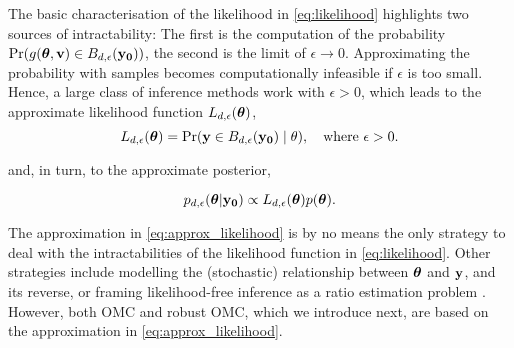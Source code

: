 The basic characterisation of the likelihood in \eqref{eq:likelihood}
highlights two sources of intractability: The first is the computation
of the probability
\(\Pr(g(\boldsymbol{\theta},\mathbf{v}) \in B_{d,\epsilon}(\mathbf{y_0}))\), the second is the
limit of \(\epsilon \to 0\).  Approximating the probability with
samples becomes computationally infeasible if \(\epsilon\) is too
small. Hence, a large class of inference methods work with
\(\epsilon > 0\), which leads to the approximate likelihood function
\(L_{d, \epsilon}(\boldsymbol{\theta})\),
\begin{equation} \label{eq:approx_likelihood}
  L_{d, \epsilon}(\boldsymbol{\theta}) = \Pr(\mathbf{y} \in B_{d,\epsilon}(\mathbf{y_0}) \mid \theta), \quad \text{where  } \epsilon > 0.
\end{equation}

and, in turn, to the approximate posterior,

\begin{equation} \label{eq:approx_posterior}
  p_{d,\epsilon}(\boldsymbol{\theta}|\mathbf{y_0}) \propto L_{d, \epsilon}(\boldsymbol{\theta}) p(\boldsymbol{\theta}).
\end{equation}

The approximation in \eqref{eq:approx_likelihood} is by no means the
only strategy to deal with the intractabilities of the likelihood
function in \eqref{eq:likelihood}. Other strategies include modelling
the (stochastic) relationship between \(\boldsymbol{\theta}\) and \(\mathbf{y}\), and its
reverse, or framing likelihood-free inference as a ratio estimation
problem \citep[see e.g.\ ][]{Blum2010, Wood2010, Papamakarios2016,
  Thomas2016, Papamakarios2019, Chen2019, Thomas2020,
  Hermans2020}. However, both OMC and robust OMC, which we introduce
next, are based on the approximation in \eqref{eq:approx_likelihood}.

